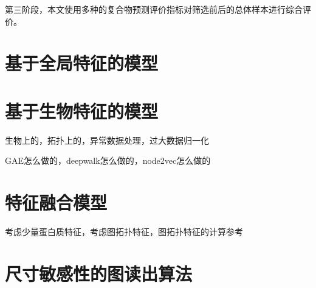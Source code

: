 第三阶段，本文使用多种的复合物预测评价指标对筛选前后的总体样本进行综合评价。


\section{基于全局特征的模型}
\label{section:GlobalfeatBaseModel}




\section{基于生物特征的模型}
\label{section:biofeatBaseModel}

生物上的，拓扑上的，异常数据处理，过大数据归一化

GAE怎么做的，deepwalk怎么做的，node2vec怎么做的
\section{特征融合模型}
\label{section:fusionfeatBaseModel}
考虑少量蛋白质特征，考虑图拓扑特征，图拓扑特征的计算参考\cite{yu_predicting_2014}
\section{尺寸敏感性的图读出算法}
\label{section:GPool}
